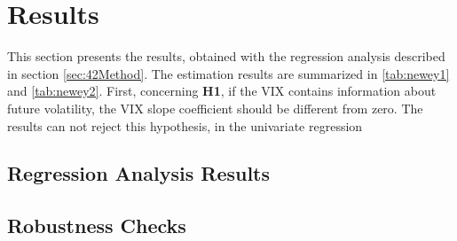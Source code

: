
\section{Results}\label{sec:5Results}

This section presents the results, obtained with the regression analysis described in section \ref{sec:42Method}. The estimation results are summarized in \ref{tab:newey1} and \ref{tab:newey2}. First, concerning \textbf{H1}, if the VIX contains information about future volatility, the VIX slope coefficient should be different from zero. The results can not reject this hypothesis, in the univariate regression 

\subsection{Regression Analysis Results}\label{sec:51Regression}
%
\label{tab:newey1}
%
\label{tab:newey2}
%
%

\subsection{Robustness Checks}\label{sec51Robustness}


